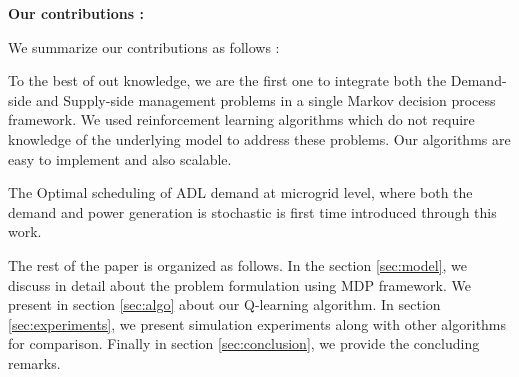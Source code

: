\textbf{Our contributions :}
\begin{inparaenum}[\bfseries (i)]
We summarize our contributions as follows :\\
\item To the best of out knowledge, we are the first one to integrate both the Demand-side and Supply-side management problems  in a single Markov decision process framework. We used reinforcement learning algorithms which do not require knowledge of the underlying model to address these problems. Our algorithms are easy to implement and also scalable.\\
\item The Optimal scheduling of ADL demand at microgrid level, where both the demand and power generation is stochastic is first time introduced through this work. \\    
\end{inparaenum}

The rest of the paper is organized as follows. In the section \ref{sec:model}, we discuss in detail about the problem formulation using MDP framework. We present  in section \ref{sec:algo} about our Q-learning algorithm. In section \ref{sec:experiments}, we present simulation experiments along with other algorithms for comparison. Finally in section \ref{sec:conclusion}, we provide the concluding remarks.